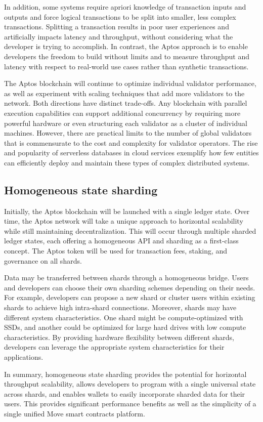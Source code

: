 \documentclass{article}
\begin{document}
In addition, some systems require apriori knowledge of transaction inputs and outputs and force logical transactions to be split into smaller, less complex transactions. Splitting a transaction results in poor user experiences and artificially impacts latency and throughput, without considering what the developer is trying to accomplish. In contrast, the Aptos approach is to enable developers the freedom to build without limits and to measure throughput and latency with respect to real-world use cases rather than synthetic transactions.

The Aptos blockchain will continue to optimize individual validator performance, as well as experiment with scaling techniques that add more validators to the network. Both directions have distinct trade-offs. Any blockchain with parallel execution capabilities can support additional concurrency by requiring more powerful hardware or even structuring each validator as a cluster of individual machines. However, there are practical limits to the number of global validators that is commensurate to the cost and complexity for validator operators. The rise and popularity of serverless databases in cloud services exemplify how few entities can efficiently deploy and maintain these types of complex distributed systems.

\subsection{Homogeneous state sharding}

 Initially, the Aptos blockchain will be launched with a single ledger state. Over time, the Aptos network will take a unique approach to horizontal scalability while still maintaining decentralization. This will occur through multiple sharded ledger states, each offering a homogeneous API and sharding as a first-class concept. The Aptos token will be used for transaction fees, staking, and governance on all shards.
 
 Data may be transferred between shards through a homogeneous bridge. Users and developers can choose their own sharding schemes depending on their needs. For example, developers can propose a new shard or cluster users within existing shards to achieve high intra-shard connections. Moreover, shards may have different system characteristics. One shard might be compute-optimized with SSDs, and another could be optimized for large hard drives with low compute characteristics. By providing hardware flexibility between different shards, developers can leverage the appropriate system characteristics for their applications.
 
 In summary, homogeneous state sharding provides the potential for horizontal throughput scalability, allows developers to program with a single universal state across shards, and enables wallets to easily incorporate sharded data for their users. This provides significant performance benefits as well as the simplicity of a single unified Move smart contracts platform.


\small{

}
\end{document}
